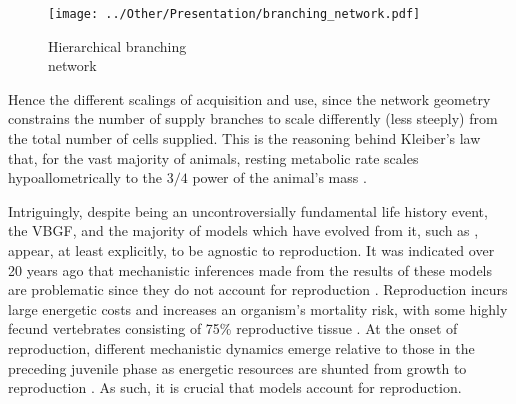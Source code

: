 \documentclass[a4paper]{article} %
\begin{document}
        \begin{wrapfigure}{l}{0.3\textwidth}
            \begin{center}
              \texttt{[image: ../Other/Presentation/branching\_network.pdf]}
            \end{center}
            \caption{Hierarchical branching \\ network}
        \end{wrapfigure}
        
        Hence the different scalings of acquisition and use, since the network geometry constrains the number of supply branches to scale differently (less steeply) from the total number of cells supplied. This is the reasoning behind Kleiber's law that, for the vast majority of animals, resting metabolic rate scales hypoallometrically to the $3/4$ power of the animal's mass \autocite{Kleiber1947, peters1983, niklas1994plant}. 

        Intriguingly, despite being an uncontroversially fundamental life history event, the VBGF, and the majority of models which have evolved from it, such as \cite{West2001}, appear, at least explicitly, to be agnostic to reproduction. It was indicated over 20 years ago that mechanistic inferences made from the results of these models are problematic since they do not account for reproduction \autocite{Day1997, Marshall2019b}. Reproduction incurs large energetic costs and increases an organism's mortality risk, with some highly fecund vertebrates consisting of 75\% reproductive tissue \autocite{Parker2018}. At the onset of reproduction, different mechanistic dynamics emerge relative to those in the preceding juvenile phase as energetic resources are shunted from growth to reproduction \autocite{Day1997}. As such, it is crucial that models account for reproduction.
\end{document}
